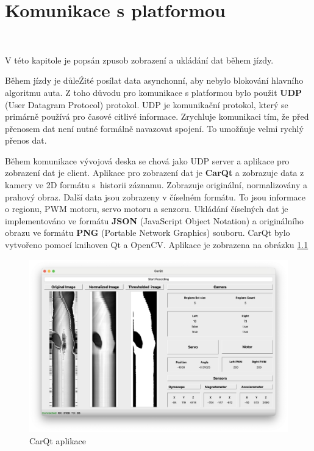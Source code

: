 \chapter{Komunikace s platformou}
\label{sec:PlatformCommunication}
\vspace{-20pt}
\

V této kapitole je popsán zpusob zobrazení a ukládání dat během jízdy.

Během jízdy je důleŹité posílat data asynchonní, aby nebylo blokování hlavního algoritmu auta.
Z toho důvodu pro komunikace s platformou bylo použit \textbf{UDP}
(User Datagram Protocol) protokol.  UDP je komunikační protokol,
který se primárně používá pro časové citlivé informace.
Zrychluje komunikaci tím, že před přenosem dat není nutné formálně navazovat spojení.
To umožňuje velmi rychlý přenos dat\cite{UDP}.

Během komunikace vývojová deska se chová jako UDP server a aplikace pro zobrazení dat
je client. Aplikace pro zobrazení dat je \textbf{CarQt} a zobrazuje data z kamery
ve 2D formátu  s~historii záznamu. Zobrazuje originální,
normalizovány a prahový obraz. Další data
jsou zobrazeny v číselném formátu. To jsou informace o regionu, PWM motoru, servo motoru
a senzoru. Ukládání číselných dat je implementováno ve formátu \textbf{JSON}
(JavaScript Object Notation) a originálního obrazu ve formátu \textbf{PNG}
(Portable Network Graphics) souboru. CarQt bylo vytvořeno pomocí knihoven Qt a OpenCV.
Aplikace je zobrazena na obrázku \ref{fig:CarQt}
\begin{figure}[!h]
    \centering
    \includegraphics[width = .5\linewidth]{Figures/CarQt.png}
    \caption{CarQt aplikace}
    \label{fig:CarQt}
\end{figure}


